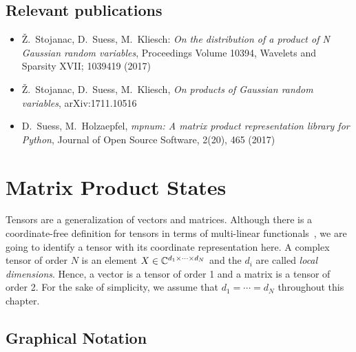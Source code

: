 \subsection*{Relevant publications}
\begin{itemize}
  \item Ž.\ Stojanac, D.\ Suess, M.\ Kliesch: \textit{On the distribution of a product of N Gaussian random variables}, Proceedings Volume 10394, Wavelets and Sparsity XVII; 1039419 (2017)
  \item Ž.\ Stojanac, D.\ Suess, M.\ Kliesch, \textit{On products of Gaussian random variables}, arXiv:1711.10516
  \item D.\ Suess, M.\ Holzaepfel, \textit{mpnum: A matrix product representation library for Python}, Journal of Open Source Software, 2(20), 465 (2017)
\end{itemize}
\section{Matrix Product States}%
\label{sec:tensors.mps}

Tensors are a generalization of vectors and matrices.
Although there is a coordinate-free definition for tensors in terms of multi-linear functionals~\cite{Browder_2012_Mathematical}, we are going to identify a tensor with its coordinate representation here.
A complex tensor of order $N$ is an element $X \in {\mathbb{C}}^{d_1 \times \cdots \times d_N}$ and the $d_i$ are called \emph{local dimensions}.
Hence, a vector is a tensor of order 1 and a matrix is a tensor of order 2.
For the sake of simplicity, we assume that $d_1 = \cdots = d_N$ throughout this chapter.



\subsection{Graphical Notation}
\label{sub:mps.graphical_notation}


